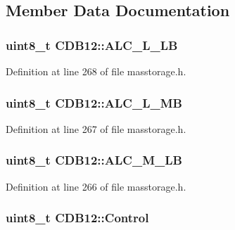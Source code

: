 \subsection{\-Member \-Data \-Documentation}
\hypertarget{struct_c_d_b12_a20b3adfe30452dfcb15466097223dc96}{
\subsubsection[{\-A\-L\-C\-\_\-\-L\-\_\-\-L\-B}]{\setlength{\rightskip}{0pt plus 5cm}uint8\-\_\-t {\bf \-C\-D\-B12\-::\-A\-L\-C\-\_\-\-L\-\_\-\-L\-B}}}\label{struct_c_d_b12_a20b3adfe30452dfcb15466097223dc96}


\-Definition at line 268 of file masstorage.\-h.

\hypertarget{struct_c_d_b12_a02594e3177ddf6fbc85b11182a00e686}{
\subsubsection[{\-A\-L\-C\-\_\-\-L\-\_\-\-M\-B}]{\setlength{\rightskip}{0pt plus 5cm}uint8\-\_\-t {\bf \-C\-D\-B12\-::\-A\-L\-C\-\_\-\-L\-\_\-\-M\-B}}}\label{struct_c_d_b12_a02594e3177ddf6fbc85b11182a00e686}


\-Definition at line 267 of file masstorage.\-h.

\hypertarget{struct_c_d_b12_a4ff6f2492ed55afa147edeb4605e6c06}{
\subsubsection[{\-A\-L\-C\-\_\-\-M\-\_\-\-L\-B}]{\setlength{\rightskip}{0pt plus 5cm}uint8\-\_\-t {\bf \-C\-D\-B12\-::\-A\-L\-C\-\_\-\-M\-\_\-\-L\-B}}}\label{struct_c_d_b12_a4ff6f2492ed55afa147edeb4605e6c06}


\-Definition at line 266 of file masstorage.\-h.

\hypertarget{struct_c_d_b12_a1478895d17ea1ba1e2a70f5f5904e0b7}{
\subsubsection[{\-Control}]{\setlength{\rightskip}{0pt plus 5cm}uint8\-\_\-t {\bf \-C\-D\-B12\-::\-Control}}}\label{struct_c_d_b12_a1478895d17ea1ba1e2a70f5f5904e0b7}


